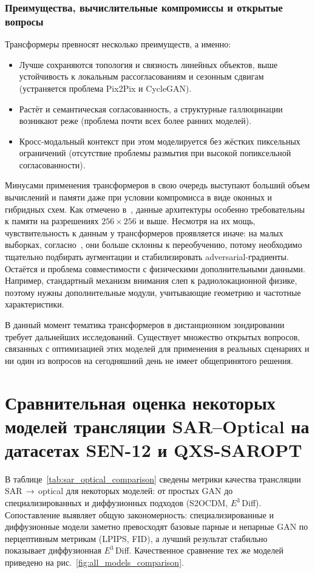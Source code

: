 \subsubsection{Преимущества, вычислительные компромиссы и открытые вопросы}
Трансформеры превносят несколько преимуществ, а именно:
\begin{itemize}
    \item Лучше сохраняются топология и связность линейных объектов, выше устойчивость к локальным рассогласованиям и сезонным сдвигам (устраняется проблема Pix2Pix и CycleGAN).
    \item Растёт и семантическая согласованность, а структурные галлюцинации возникают реже (проблема почти всех более ранних моделей).
    \item Кросс-модальный контекст при этом моделируется без жёстких пиксельных ограничений (отсутствие проблемы размытия при высокой попиксельной согласованности).
\end{itemize}

Минусами применения трансформеров в свою очередь выступают больший объем вычислений и памяти даже при условии компромисса в виде оконных и гибридных схем.
Как отмечено в~\cite{wang2025generative}, данные архитектуры особенно требовательны к памяти на разрешениях $256\times256$ и выше.
Несмотря на их мощь, чувствительность к данным у трансформеров проявляется иначе: на малых выборках, согласно~\cite{zhao2025hvt, wang2025generative}, они больше склонны к переобучению, потому необходимо тщательно подбирать аугментации и стабилизировать adversarial-градиенты.
Остаётся и проблема совместимости с физическими дополнительными данными.
Например, стандартный механизм внимания слеп к радиолокационной физике, поэтому нужны дополнительные модули, учитывающие геометрию и частотные характеристики.

В данный момент тематика трансформеров в дистанционном зондировании требует дальнейших исследований.
Существует множество открытых вопросов, связанных с оптимизацией этих моделей для применения в реальных сценариях и ни один из вопросов на сегодняшний день не имеет общепринятого решения.

\section{Сравнительная оценка некоторых моделей трансляции SAR--Optical на датасетах SEN-12 и QXS-SAROPT}

В таблице~\ref{tab:sar_optical_comparison} сведены метрики качества трансляции SAR\,$\to$\,optical для некоторых моделей: от простых GAN до специализированных и диффузионных подходов (S2OCDM, $E^3$\,Diff).
Сопоставление выявляет общую закономерность: специализированные и диффузионные модели заметно превосходят базовые парные и непарные GAN по перцептивным метрикам (LPIPS, FID), а лучший результат стабильно показывает диффузионная $E^3$\,Diff.
Качественное сравнение тех же моделей приведено на рис.~\ref{fig:all_models_comparison}.

